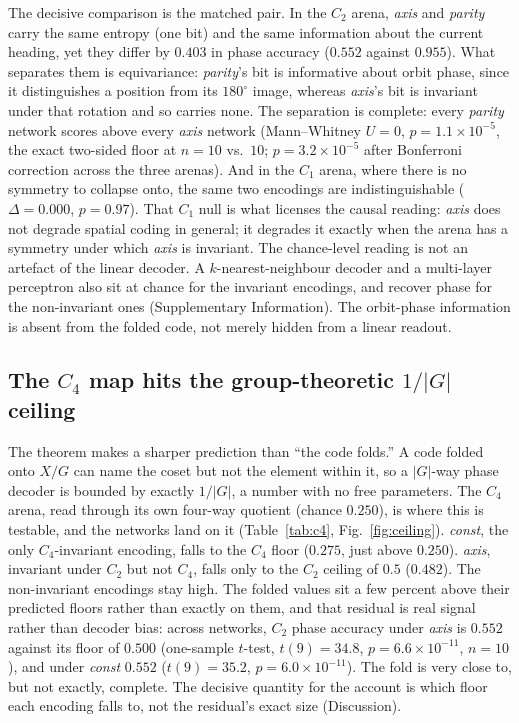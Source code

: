 The decisive comparison is the matched pair. In the $C_2$ arena, \textit{axis} and \textit{parity}
carry the same entropy (one bit) and the same information about the current heading, yet they differ
by $0.403$ in phase accuracy ($0.552$ against $0.955$). What separates them is equivariance:
\textit{parity}'s bit is informative about orbit phase, since it distinguishes a position from its
$180^\circ$ image, whereas \textit{axis}'s bit is invariant under that rotation and so carries none.
The separation is complete: every \textit{parity} network scores above every \textit{axis} network
(Mann--Whitney $U=0$, $p = 1.1\times10^{-5}$, the exact two-sided floor at $n=10$ vs.\ $10$;
$p = 3.2\times10^{-5}$ after Bonferroni correction across the three arenas). And in the $C_1$ arena,
where there is no symmetry to collapse onto, the same two encodings are indistinguishable
($\Delta = 0.000$, $p = 0.97$). That $C_1$ null is what licenses the causal reading: \textit{axis}
does not degrade spatial coding in general; it degrades it exactly when the arena has a symmetry under
which \textit{axis} is invariant. The chance-level reading is not an artefact of the linear decoder. A
$k$-nearest-neighbour decoder and a multi-layer perceptron also sit at chance for the invariant
encodings, and recover phase for the non-invariant ones (Supplementary Information). The orbit-phase
information is absent from the folded code, not merely hidden from a linear readout.

\subsection*{The $C_4$ map hits the group-theoretic $1/|G|$ ceiling}

The theorem makes a sharper prediction than ``the code folds.'' A code folded onto $X/G$ can name the
coset but not the element within it, so a $|G|$-way phase decoder is bounded by exactly $1/|G|$, a
number with no free parameters. The $C_4$ arena, read through its own four-way quotient (chance
$0.250$), is where this is testable, and the networks land on it (Table~\ref{tab:c4},
Fig.~\ref{fig:ceiling}). \textit{const}, the only $C_4$-invariant encoding, falls to the $C_4$ floor
($0.275$, just above $0.250$). \textit{axis}, invariant under $C_2$ but not $C_4$, falls only to the
$C_2$ ceiling of $0.5$ ($0.482$). The non-invariant encodings stay high. The folded values sit a few
percent above their predicted floors rather than exactly on them, and that residual is real signal
rather than decoder bias: across networks, $C_2$ phase accuracy under \textit{axis} is $0.552$ against
its floor of $0.500$ (one-sample $t$-test, $t(9) = 34.8$, $p = 6.6\times10^{-11}$, $n = 10$), and
under \textit{const} $0.552$ ($t(9) = 35.2$, $p = 6.0\times10^{-11}$). The fold is very close to, but
not exactly, complete. The decisive quantity for the account is which floor each encoding falls to,
not the residual's exact size (Discussion).


